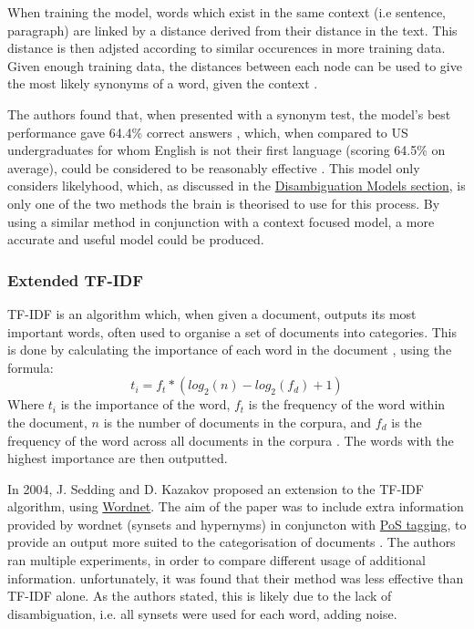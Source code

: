 \documentclass[]{article}
\begin{document}
When training the model, words which exist in the same context (i.e sentence, paragraph) are linked by a distance derived from their distance in the text. This distance is then adjsted according to similar occurences in more training data. Given enough training data, the distances between each node can be used to give the most likely synonyms of a word, given the context \cite{LatentSemanticAnalysis}.

The authors found that, when presented with a synonym test, the model's best performance gave 64.4\% correct answers , which, when compared to US undergraduates for whom English is not their first language (scoring 64.5\% on average), could be considered to be reasonably effective \cite{LatentSemanticAnalysis}. This model only considers likelyhood, which, as discussed in the \hyperref[sec:DisambiguationModels]{Disambiguation Models section}, is only one of the two methods the brain is theorised to use for this process. By using a similar method in conjunction with a context focused model, a more accurate and useful model could be produced.

\subsubsection{Extended TF-IDF}
\label{sec:TFIDF}

TF-IDF is an algorithm which, when given a document, outputs its most important words, often used to organise a set of documents into categories. This is done by calculating the importance of each word in the document \cite{TFIDF}, using the formula:
\[t_i = f_t * (log_2(n)-log_2(f_d)+1)\]
Where \(t_i\) is the importance of the word, \(f_t\) is the frequency of the word within the document, \(n\) is the number of documents in the corpura, and \(f_d\) is the frequency of the word across all documents in the corpura \cite{SeddingKazakov}. The  words with the highest importance are then outputted.

In 2004, J. Sedding and D. Kazakov proposed an extension to the TF-IDF algorithm, using \hyperref[Wordnet]{Wordnet}. The aim of the paper was to include extra information provided by wordnet (synsets and hypernyms) in conjuncton with \hyperref[PoSTag]{PoS tagging}, to provide an output more suited to the categorisation of documents \cite{SeddingKazakov}. The authors ran multiple experiments, in order to compare different usage of additional information. unfortunately, it was found that their method was less effective than TF-IDF alone. As the authors stated, this is likely due to the lack of disambiguation, i.e. all synsets were used for each word, adding noise.
\end{document}

